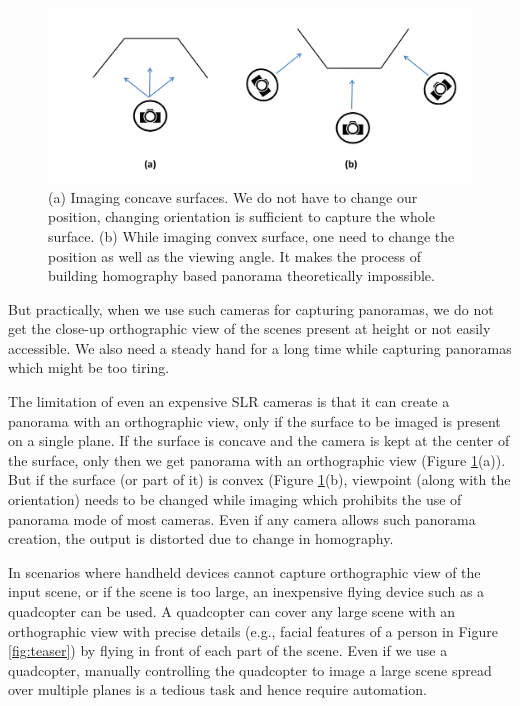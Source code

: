 \begin{figure}[htb]
\centering
\includegraphics[width=\textwidth]{figures/multiplanar/ConcaveConvex}
\caption[Imaging concave surfaces versus convex surfaces ]{(a) Imaging concave
surfaces. We do not have to change our position, changing orientation is
sufficient to capture the whole surface. (b) While imaging convex surface, one
need to change the position as well as the viewing angle. It makes the process
of building homography based panorama  theoretically impossible.}
\label{fig:convex_concave}
\end{figure}

But practically, when we use such cameras for capturing panoramas, we do not
get the close-up orthographic view of the scenes present at height or not
easily accessible. We also need a steady hand for a long time while capturing
panoramas which might be too tiring.

The limitation of even an expensive SLR cameras is that it can create a panorama with
an orthographic view, only if the surface to be imaged is present on a single
plane. If the surface is concave and the camera is kept at the center of the
surface, only then we get panorama with an orthographic view (Figure
\ref{fig:convex_concave}(a)). But if the surface (or part of it) is convex (Figure \ref{fig:convex_concave}(b),
 viewpoint (along with the orientation) needs to be changed while imaging which
 prohibits the use of panorama mode of most cameras. Even if any camera allows such panorama creation, the output
is distorted due to change in homography. 

In scenarios where handheld devices cannot capture orthographic view of the
input scene, or if the scene is too large, an inexpensive flying device such as
a quadcopter can be used. A quadcopter can cover any large scene with
an orthographic view with precise details (e.g., facial features of a person in
Figure \ref{fig:teaser}) by flying in front of each part of the scene.
Even if we use a quadcopter, manually controlling the quadcopter to image a
large scene spread over multiple planes is a tedious task and hence require
automation.

